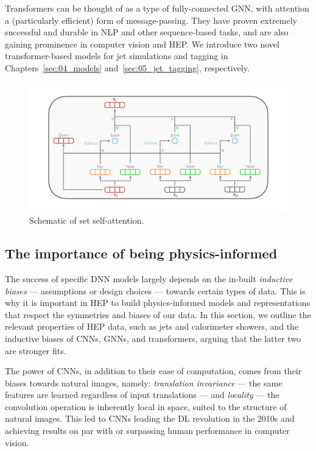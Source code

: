 Transformers can be thought of as a type of fully-connected GNN, with attention a (particularly efficient) form of message-passing.
They have proven extremely successful and durable in NLP and other sequence-based tasks, and are also gaining prominence in computer vision and HEP.
We introduce two novel transformer-based models for jet simulations and tagging in Chapters~\ref{sec:04_models} and~\ref{sec:05_jet_tagging}, respectively.

\begin{figure}[ht]
    \centering
    \captionsetup{justification=centering}
    \includegraphics[width=\textwidth]{figures/04-ML4Sim/igapt/attention.pdf}
    \caption{Schematic of set self-attention.}
    \label{fig:04_gapt_attention}
\end{figure}


\subsection{The importance of being physics-informed}
\label{sec:03_ml_physics}

The success of specific DNN models largely depends on the in-built \textit{inductive biases} --- assumptions or design choices --- towards certain types of data.
This is why it is important in HEP to build physics-informed models and representations that respect the symmetries and biases of our data.
In this section, we outline the relevant properties of HEP data, such as jets and calorimeter showers, and the inductive biases of CNNs, GNNs, and transformers, arguing that the latter two are stronger fits.

The power of CNNs, in addition to their ease of computation, comes from their biases towards natural images, namely: \textit{translation invariance} --- the same features are learned regardless of input translations --- and \textit{locality} --- the convolution operation is inherently local in space, suited to the structure of natural images.
This led to CNNs leading the DL revolution in the 2010s and achieving results on par with or surpassing human performance in computer vision.

